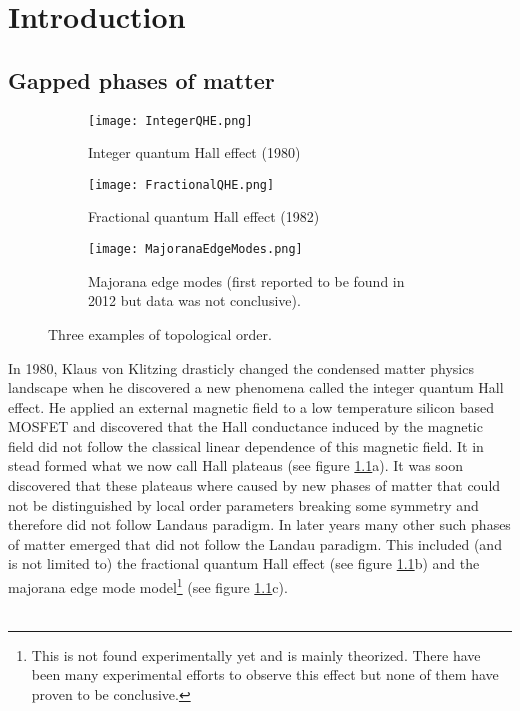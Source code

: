 \chapter{Introduction}\label{ch:introduction}
\section{Gapped phases of matter}
\begin{figure}
	\centering
	\begin{subfigure}[b]{0.3\textwidth}
		\centering
		\texttt{[image: IntegerQHE.png]}
		\caption{Integer quantum Hall effect (1980)}
	\end{subfigure}
	\hfill
	\begin{subfigure}[b]{0.3\textwidth}
		\centering
		\texttt{[image: FractionalQHE.png]}
		\caption{Fractional quantum Hall effect (1982)}
	\end{subfigure}
	\hfill
	\begin{subfigure}[b]{0.3\textwidth}
		\centering
		\texttt{[image: MajoranaEdgeModes.png]}
		\caption{Majorana edge modes (first reported to be found in 2012 but data was not conclusive).}
	\end{subfigure}
	\caption{Three examples of topological order.}
	\label{fig:TopologicalOrderFigures}
\end{figure}
In 1980, Klaus von Klitzing drasticly changed the condensed matter physics landscape when he discovered a new phenomena called the integer quantum Hall effect. He applied an external magnetic field to a low temperature silicon based MOSFET and discovered that the Hall conductance induced by the magnetic field did not follow the classical linear dependence of this magnetic field. It in stead formed what we now call Hall plateaus (see figure \ref{fig:TopologicalOrderFigures}a). It was soon discovered that these plateaus where caused by new phases of matter that could not be distinguished by local order parameters breaking some symmetry and therefore did not follow Landaus paradigm. In later years many other such phases of matter emerged that did not follow the Landau paradigm. This included (and is not limited to) the fractional quantum Hall effect (see figure \ref{fig:TopologicalOrderFigures}b) and the majorana edge mode model\footnote{This is not found experimentally yet and is mainly theorized. There have been many experimental efforts to observe this effect but none of them have proven to be conclusive.} (see figure \ref{fig:TopologicalOrderFigures}c).\\\\
